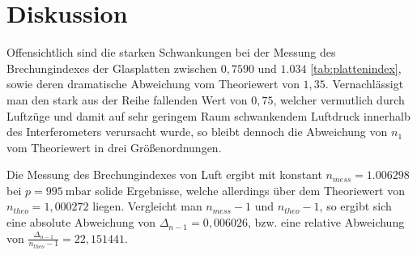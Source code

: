 \section{Diskussion}
Offensichtlich sind die starken Schwankungen bei der Messung des Brechungindexes der Glasplatten zwischen $0,7590$ und $1.034$ \ref{tab:plattenindex}, sowie deren dramatische Abweichung vom Theoriewert von $1,35$. Vernachlässigt man den stark aus der Reihe fallenden Wert von $0,75$, welcher vermutlich durch Luftzüge und damit auf sehr geringem Raum schwankendem Luftdruck innerhalb des Interferometers verursacht wurde, so bleibt dennoch die Abweichung von $n_1$ vom Theoriewert in drei Größenordnungen.

Die Messung des Brechungindexes von Luft ergibt mit konstant $n_{mess}=1.006298$ bei $p=\SI{995}{\milli\bar}$ solide Ergebnisse, welche allerdings über dem Theoriewert von $n_{theo}=1,000272$ \cite{Luftdruck} liegen. Vergleicht man $n_{mess}-1$ und $n_{theo}-1$, so ergibt sich eine absolute Abweichung von $\Delta_{n-1} = 0,006026$, bzw. eine relative Abweichung von $\frac{\Delta_{n-1}}{n_{theo}-1}=22,151441$. 
